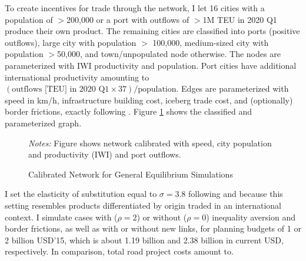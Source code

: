 \documentclass[a4paper]{article}
\begin{document}
To create incentives for trade through the network, I let 16 cities with a population of $>$200,000 or a port with outflows of $>$1M TEU in 2020 Q1 produce their own product. The remaining cities are classified into ports (positive outflows), large city with population $>$ 100,000, medium-sized city with population $>$50,000, and town/unpopulated node otherwise. The nodes are parameterized with IWI productivity and population. Port cities have additional international productivity amounting to $(\text{outflows [TEU] in 2020 Q1}\times 37)/\text{population}$. Edges are parameterized with speed in km/h, infrastructure building cost, iceberg trade cost, and (optionally) border frictions, exactly following \citet{krantz2024optimal}. Figure \ref{fig:Graph_Calib} shows the classified and parameterized graph. 


\begin{figure}[h!] \vspace{-2mm}
\centering
\caption{\label{fig:Graph_Calib} Calibrated Network for General Equilibrium Simulations}
\vspace{2mm}
\scriptsize 
\emph{Notes:} Figure shows network calibrated with speed, city population and productivity (IWI) and port outflows. 
\end{figure}

I set the elasticity of substitution equal to $\sigma = 3.8$ following \citet{bajzik2020estimating} and \citet{armington1969theory} because this setting resembles products differentiated by origin traded in an international context. I simulate cases with ($\rho = 2$) or without ($\rho = 0$) inequality aversion and border frictions, as well as with or without new links, for planning budgets of 1 or 2 billion USD'15, which is about 1.19 billion and 2.38 billion in current USD, respectively. In comparison, total road project costs amount to. 




\newpage


\end{document}
